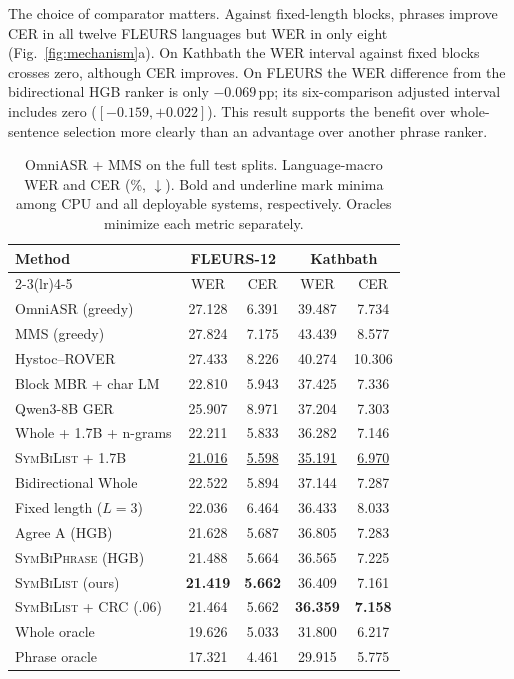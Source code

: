 \documentclass[conference,letterpaper]{IEEEtran}
\newcommand{\pp}{\ensuremath{\,\mathrm{pp}}}
\newcommand{\SymBiPhrase}{\textup{\textsc{SymBiPhrase}}}
\newcommand{\SymBiList}{\textup{\textsc{SymBiList}}}
\newcommand{\crc}{\textup{\textsc{CRC}}}
\begin{document}
The choice of comparator matters. Against fixed-length blocks, phrases improve CER in all twelve FLEURS languages but WER in only eight (Fig.~\ref{fig:mechanism}a). On Kathbath the WER interval against fixed blocks crosses zero, although CER improves. On FLEURS the WER difference from the bidirectional HGB ranker is only $-0.069\pp$; its six-comparison adjusted interval includes zero ($[-0.159,+0.022]$). This result supports the benefit over whole-sentence selection more clearly than an advantage over another phrase ranker.

\begin{table}[t]
\caption{OmniASR + MMS on the full test splits. Language-macro WER and CER (\%, $\downarrow$). Bold and underline mark minima among CPU and all deployable systems, respectively. Oracles minimize each metric separately.}\label{tab:main}
\centering\footnotesize\setlength{\tabcolsep}{1.6pt}
\begin{tabular*}{\columnwidth}{@{\extracolsep{\fill}}lcccc@{}}\toprule
\multirow{2}{*}{Method} & \multicolumn{2}{c}{FLEURS-12} & \multicolumn{2}{c}{Kathbath}\\
\cmidrule(lr){2-3}\cmidrule(lr){4-5}
& WER & CER & WER & CER\\\midrule
OmniASR (greedy) & 27.128 & 6.391 & 39.487 & 7.734\\
MMS (greedy) & 27.824 & 7.175 & 43.439 & 8.577\\
\midrule
Hystoc--ROVER & 27.433 & 8.226 & 40.274 & 10.306\\
Block MBR + char LM & 22.810 & 5.943 & 37.425 & 7.336\\
\midrule
Qwen3-8B GER & 25.907 & 8.971 & 37.204 & 7.303\\
Whole + 1.7B + n-grams & 22.211 & 5.833 & 36.282 & 7.146\\
\SymBiList{} + 1.7B & \underline{21.016} & \underline{5.598} & \underline{35.191} & \underline{6.970}\\
\midrule
Bidirectional Whole & 22.522 & 5.894 & 37.144 & 7.287\\
Fixed length ($L=3$) & 22.036 & 6.464 & 36.433 & 8.033\\
\midrule
Agree A (HGB) & 21.628 & 5.687 & 36.805 & 7.283\\
\SymBiPhrase{} (HGB) & 21.488 & 5.664 & 36.565 & 7.225\\
\SymBiList{} (ours) & \textbf{21.419} & \textbf{5.662} & 36.409 & 7.161\\
\SymBiList{} + \crc{} (.06) & 21.464 & 5.662 & \textbf{36.359} & \textbf{7.158}\\
\midrule
Whole oracle & 19.626 & 5.033 & 31.800 & 6.217\\
Phrase oracle & 17.321 & 4.461 & 29.915 & 5.775\\
\bottomrule
\end{tabular*}
\end{table}
\end{document}

